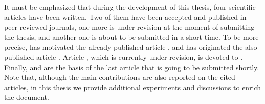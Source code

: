 It must be emphasized that during the development of this thesis, four scientific articles have been written. Two of them have been accepted and published in peer reviewed journals, one more is under revision at the moment of submitting the thesis, and another one is about to be submitted in a short time. To be more precise,  has motivated the already published article \cite{colomes_assessment_2015}, and  has originated the also published article \cite{colomes_segregated_2015}. Article \cite{colomes_mixed_2015}, which is currently under revision, is devoted to . Finally,  and  are the basis of the last article that is going to be submitted shortly. Note that, although the main contributions are also reported on the cited articles, in this thesis we provide additional experiments and discussions to enrich the document.